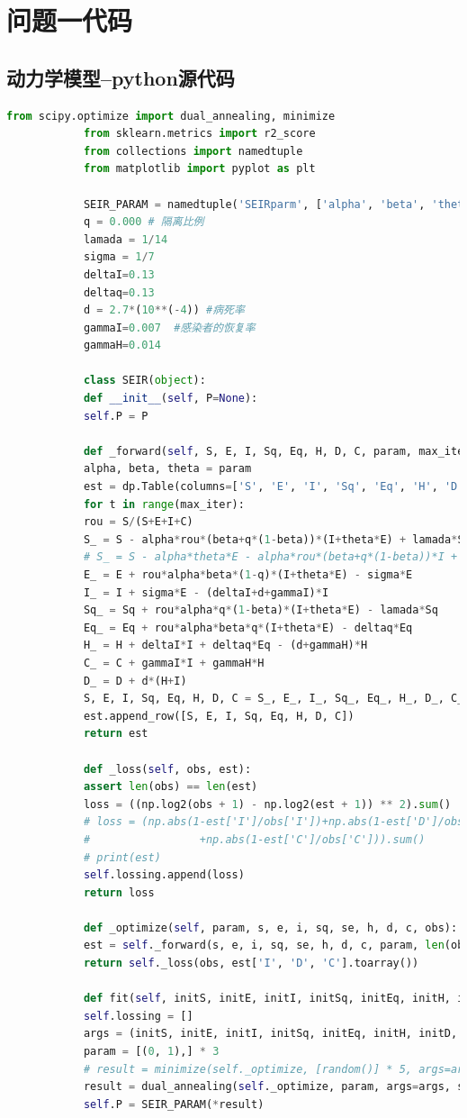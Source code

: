 \documentclass{whutmod}
\begin{document}
	\newpage
	\appendix %
	\section{问题一代码}
		\subsection*{动力学模型--python源代码}
			\begin{lstlisting}[language=python]
			from scipy.optimize import dual_annealing, minimize
			from sklearn.metrics import r2_score
			from collections import namedtuple
			from matplotlib import pyplot as plt
			
			SEIR_PARAM = namedtuple('SEIRparm', ['alpha', 'beta', 'theta'])
			q = 0.000 # 隔离比例
			lamada = 1/14
			sigma = 1/7
			deltaI=0.13
			deltaq=0.13
			d = 2.7*(10**(-4)) #病死率
			gammaI=0.007  #感染者的恢复率
			gammaH=0.014
			
			class SEIR(object):
			def __init__(self, P=None):
			self.P = P
			
			def _forward(self, S, E, I, Sq, Eq, H, D, C, param, max_iter):
			alpha, beta, theta = param
			est = dp.Table(columns=['S', 'E', 'I', 'Sq', 'Eq', 'H', 'D', 'C'])
			for t in range(max_iter):
			rou = S/(S+E+I+C)
			S_ = S - alpha*rou*(beta+q*(1-beta))*(I+theta*E) + lamada*Sq
			# S_ = S - alpha*theta*E - alpha*rou*(beta+q*(1-beta))*I + lamada*Sq
			E_ = E + rou*alpha*beta*(1-q)*(I+theta*E) - sigma*E
			I_ = I + sigma*E - (deltaI+d+gammaI)*I
			Sq_ = Sq + rou*alpha*q*(1-beta)*(I+theta*E) - lamada*Sq
			Eq_ = Eq + rou*alpha*beta*q*(I+theta*E) - deltaq*Eq
			H_ = H + deltaI*I + deltaq*Eq - (d+gammaH)*H
			C_ = C + gammaI*I + gammaH*H
			D_ = D + d*(H+I)
			S, E, I, Sq, Eq, H, D, C = S_, E_, I_, Sq_, Eq_, H_, D_, C_
			est.append_row([S, E, I, Sq, Eq, H, D, C])
			return est
			
			def _loss(self, obs, est):
			assert len(obs) == len(est)
			loss = ((np.log2(obs + 1) - np.log2(est + 1)) ** 2).sum() 
			# loss = (np.abs(1-est['I']/obs['I'])+np.abs(1-est['D']/obs['D'])
			#                 +np.abs(1-est['C']/obs['C'])).sum()
			# print(est)
			self.lossing.append(loss)
			return loss
			
			def _optimize(self, param, s, e, i, sq, se, h, d, c, obs):
			est = self._forward(s, e, i, sq, se, h, d, c, param, len(obs))
			return self._loss(obs, est['I', 'D', 'C'].toarray())
			
			def fit(self, initS, initE, initI, initSq, initEq, initH, initD, initC, Y):
			self.lossing = []
			args = (initS, initE, initI, initSq, initEq, initH, initD, initC, Y['确诊', '死亡', '治愈'].toarray())
			param = [(0, 1),] * 3
			# result = minimize(self._optimize, [random()] * 5, args=args, bounds=param)['x']
			result = dual_annealing(self._optimize, param, args=args, seed=30, maxiter=50)['x']
			self.P = SEIR_PARAM(*result)
			

\end{lstlisting}
\end{document}

